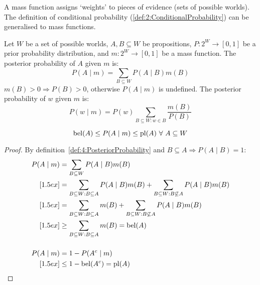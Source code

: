 A mass
function assigns `weights' to pieces of evidence (sets of possible worlds).
The definition of conditional probability (\ref{def:2:ConditionalProbability})
can be generalised to mass functions.

\begin{dfn}
  \label{def:4:PosteriorProbability}
  Let $W$ be a set of possible worlds, $A, B \subseteq W$ be propositions, $P :
    2^W \to [0, 1]$ be a prior probability distribution, and $m : 2^W \to [0, 1]$
  be a mass function.
  The posterior probability of $A$ given $m$ is:
  \begin{equation}
    P(A \mid m) = \sum_{B \subseteq W} P(A \mid B) m(B)
  \end{equation}
  $m(B) > 0
    \Rightarrow P(B) > 0$, otherwise $P(A \mid m)$ is undefined.
  The posterior probability of $w$ given $m$ is:
  \begin{equation}
    P(w \mid m) = P(w) \sum_{B \subseteq W : w \in B} \frac{m(B)}{P(B)}
  \end{equation}
\end{dfn}

\begin{thm}
  \begin{equation}
    \bel(A) \leq P(A \mid m) \leq \pl(A) \ \forall\ A \subseteq W
  \end{equation}
  \begin{proof}
    By definition~\ref{def:4:PosteriorProbability} and
    $B \subseteq A \Rightarrow P(A \mid B) = 1$:
    \begin{align*}
      P(A \mid m)
       & = \sum_{B \subseteq W} P(A \mid B) m(B)
      \\
      [1.5ex]
       & = \sum_{B \subseteq W : B \subseteq A} P(A \mid B) m(B)
      + \sum_{B \subseteq W : B \not\subseteq A} P(A \mid B) m(B)
      \\
      [1.5ex]
       & = \sum_{B \subseteq W : B \subseteq A} m(B)
      + \sum_{B \subseteq W : B \not\subseteq A} P(A \mid B) m(B)
      \\
      [1.5ex]
       & \geq \sum_{B \subseteq W : B \subseteq A} m(B) = \operatorname*{bel}(A)
      \\[3ex]
      P(A \mid m)
       & = 1 - P(A^c \mid m)
      \\
      [1.5ex]
       & \leq 1 - \operatorname*{bel}(A^c) = \operatorname*{pl}(A)
    \end{align*}
  \end{proof}
\end{thm}

